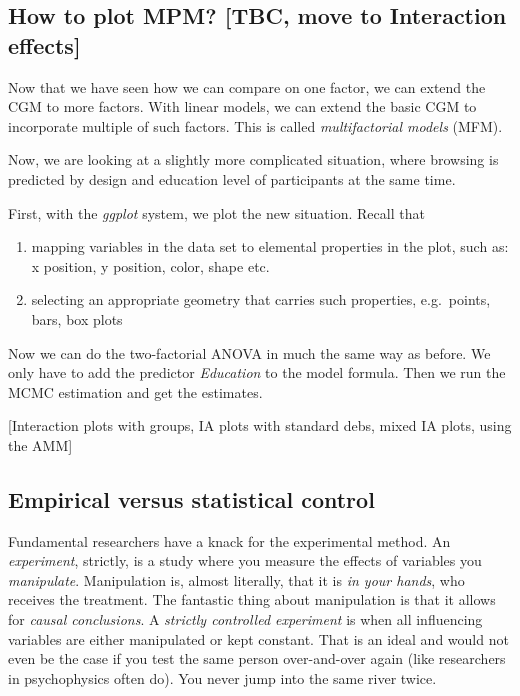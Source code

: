 \documentclass[]{svmono}
\theoremstyle{definition}
\theoremstyle{definition}
\theoremstyle{definition}
\theoremstyle{remark}
\begin{document}
\subsection{How to plot MPM? {[}TBC, move to Interaction
effects{]}}\label{how-to-plot-mpm-tbc-move-to-interaction-effects}

Now that we have seen how we can compare on one factor, we can extend
the CGM to more factors. With linear models, we can extend the basic CGM
to incorporate multiple of such factors. This is called
\emph{multifactorial models} (MFM).

Now, we are looking at a slightly more complicated situation, where
browsing is predicted by design and education level of participants at
the same time.

First, with the \emph{ggplot} system, we plot the new situation. Recall
that

\begin{enumerate}
\def\labelenumi{\arabic{enumi}.}
\item
  mapping variables in the data set to elemental properties in the plot,
  such as: x position, y position, color, shape etc.
\item
  selecting an appropriate geometry that carries such properties,
  e.g.~points, bars, box plots
\end{enumerate}

Now we can do the two-factorial ANOVA in much the same way as before. We
only have to add the predictor \emph{Education} to the model formula.
Then we run the MCMC estimation and get the estimates.

{[}Interaction plots with groups, IA plots with standard debs, mixed IA
plots, using the AMM{]}

\subsection{Empirical versus statistical
control}\label{empirical-versus-statistical-control}

Fundamental researchers have a knack for the experimental method. An
\emph{experiment}, strictly, is a study where you measure the effects of
variables you \emph{manipulate}. Manipulation is, almost literally, that
it is \emph{in your hands}, who receives the treatment. The fantastic
thing about manipulation is that it allows for \emph{causal
conclusions}. A \emph{strictly controlled experiment} is when all
influencing variables are either manipulated or kept constant. That is
an ideal and would not even be the case if you test the same person
over-and-over again (like researchers in psychophysics often do). You
never jump into the same river twice.
\end{document}
